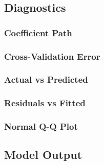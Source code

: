 \documentclass[
]{article}
\begin{document}
\subsection{Diagnostics}\label{diagnostics}

\subsubsection{Coefficient Path}\label{coefficient-path}

\subsubsection{Cross-Validation Error}\label{cross-validation-error}

\subsubsection{Actual vs Predicted}\label{actual-vs-predicted}

\subsubsection{Residuals vs Fitted}\label{residuals-vs-fitted}

\subsubsection{Normal Q-Q Plot}\label{normal-q-q-plot}

\subsection{Model Output}\label{model-output}
\end{document}
